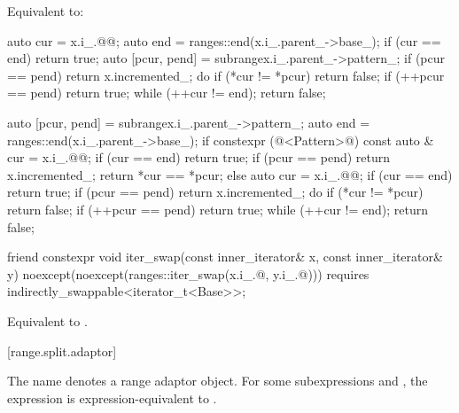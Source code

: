 \documentclass{wg21}
\begin{document}
\begin{itemdescr}
\pnum
\effects Equivalent to:
\begin{removedblock}
\begin{codeblock}
	auto cur = x.i_.@@;
	auto end = ranges::end(x.i_.parent_->base_);
	if (cur == end) return true;
	auto [pcur, pend] = subrange{x.i_.parent_->pattern_};
	if (pcur == pend) return x.incremented_;
	do {
		if (*cur != *pcur) return false;
		if (++pcur == pend) return true;
	} while (++cur != end);
	return false;
\end{codeblock}
\end{removedblock}

\begin{addedblock}
\begin{codeblock}
	auto [pcur, pend] = subrange{x.i_.parent_->pattern_};
	auto end = ranges::end(x.i_.parent_->base_);
	if constexpr (@<Pattern>@) {
		const auto & cur = x.i_.@@;
		if (cur == end) return true;
		if (pcur == pend) return x.incremented_;
		return *cur == *pcur;
	}
	else {
		auto cur = x.i_.@@;
		if (cur == end) return true;
		if (pcur == pend) return x.incremented_;
		do {
			if (*cur != *pcur) return false;
			if (++pcur == pend) return true;
		} while (++cur != end);
		return false;
	}
\end{codeblock}
\end{addedblock}

\end{itemdescr}

%
\begin{itemdecl}
friend constexpr void iter_swap(const inner_iterator& x, const inner_iterator& y)
noexcept(noexcept(ranges::iter_swap(x.i_.@, y.i_.@)))
requires indirectly_swappable<iterator_t<Base>>;
\end{itemdecl}

\begin{itemdescr}
\pnum
\effects Equivalent to
.
\end{itemdescr}

[range.split.adaptor]{}

\pnum
The name  denotes a
range adaptor object.
For some subexpressions  and ,
the expression  is expression-equivalent to
.
\end{document}
